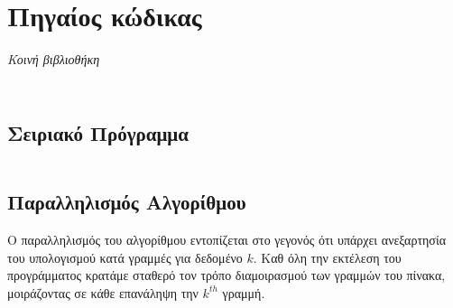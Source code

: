 \documentclass[a4paper,10pt]{article} \usepackage{anysize}
\begin{document}

\renewcommand{\theenumi}{\roman{enumi}}


\def\thesubsection {Ζητούμενο \arabic{subsection}}
\section*{Πηγαίος κώδικας}

\emph{Κοινή βιβλιοθήκη}

\inputminted[linenos,fontsize=\footnotesize,frame=leftline]{c}{files/src-lib-common.h}

\inputminted[linenos,fontsize=\footnotesize,frame=leftline]{c}{files/src-lib-common.c}

\setcounter{section}{1}
\subsection{Σειριακό Πρόγραμμα}

\inputminted[linenos,fontsize=\footnotesize,frame=leftline]{c}{files/src-serial-main.c}

\subsection{Παραλληλισμός Αλγορίθμου}

Ο παραλληλισμός του αλγορίθμου εντοπίζεται στο γεγονός ότι υπάρχει ανεξαρτησία
του υπολογισμού κατά γραμμές για δεδομένο $k$. Καθ όλη την εκτέλεση του
προγράμματος κρατάμε σταθερό τον τρόπο διαμοιρασμού των γραμμών του πίνακα,
μοιράζοντας σε κάθε επανάληψη την $k^{th}$ γραμμή. 
\end{document}
